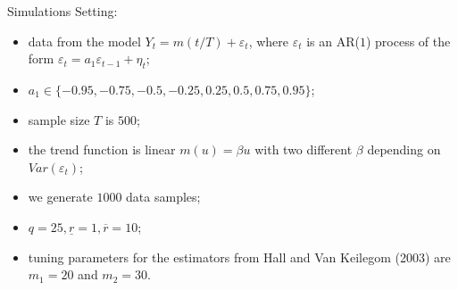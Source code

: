 \documentclass[10pt, handout]{beamer}
\begin{document}
\begin{frame}{Simulations}
Setting:
\begin{itemize}
\item data from the model $Y_t = m(t/T) + \varepsilon_t$, where $\varepsilon_t$ is an AR($1$) process of the form $\varepsilon_t = a_1 \varepsilon_{t-1} + \eta_t$;
\item $a_1 \in \{ -0.95, -0.75, -0.5, -0.25, 0.25, 0.5, 0.75, 0.95\}$;
\item sample size $T$ is $500$;
\item the trend function is linear $m(u) = \beta u$ with two different $\beta$ depending on $Var(\varepsilon_t)$;
\item we generate $1000$ data samples;
\item $q=25, \underline{r} = 1, \overline{r} = 10$;
\item tuning parameters for the estimators from Hall and Van Keilegom (2003) are $m_1 = 20$ and $m_2 = 30$. 
\end{itemize}

\end{frame}
\end{document}
